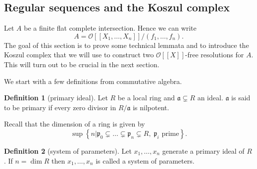\documentclass{article}
\theoremstyle{plain}%
\theoremstyle{definition}
\newtheorem{definition}{Definition}[section]
\theoremstyle{remark}
\begin{document}
\subsection{Regular sequences and the Koszul complex}
Let \(A\) be a finite flat complete intersection. Hence we can write 
\[A = \mathcal{O}[[X_1, \dots, X_n]]/(f_1, \dots, f_n).\]
The goal of this section is to prove some technical lemmata and to introduce
the Koszul complex that we will use to construct two \(\mathcal{O}[[X]]\)-free resolutions for \(A\).
This will turn out to be crucial in the next section.

We start with a few definitions from commutative algebra.
\begin{definition}[primary ideal]
    Let \(R\) be a local ring and \(\mathfrak{a} \subsetneq R\) an ideal. 
    \(\mathfrak{a}\) is said to be primary if every zero divisor in \(R/\mathfrak{a}\) is nilpotent.
\end{definition}
Recall that the dimension of a ring is given by
\[
    \sup \left\{n | 
                \mathfrak{p}_0 \subsetneq \dots \subsetneq \mathfrak{p}_n \subsetneq R,\; \mathfrak{p}_i \text{ prime} 
        \right\}.
\]
\begin{definition}[system of parameters]
    Let \(x_1, \dots, x_n\) generate a primary ideal of \(R\). If \(n = \dim R\) then \(x_1, \dots, x_n\) is called 
    a system of parameters.
\end{definition}
\end{document}

